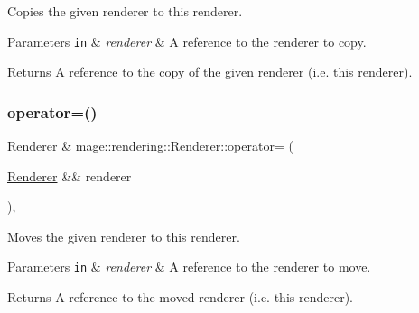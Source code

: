 Copies the given renderer to this renderer.


\begin{DoxyParams}[1]{Parameters}
\mbox{\tt in}  & {\em renderer} & A reference to the renderer to copy. \\
\hline
\end{DoxyParams}
\begin{DoxyReturn}{Returns}
A reference to the copy of the given renderer (i.\+e. this renderer). 
\end{DoxyReturn}
\mbox{\label{classmage_1_1rendering_1_1_renderer_a8f0f0323dc57cf2e1f76491bf6eaa97a}} 
\subsubsection{\texorpdfstring{operator=()}{operator=()}\hspace{0.1cm}{\footnotesize\ttfamily [2/2]}}
{\footnotesize\ttfamily \mbox{\hyperlink{classmage_1_1rendering_1_1_renderer}{Renderer}} \& mage\+::rendering\+::\+Renderer\+::operator= (\begin{DoxyParamCaption}\item[{\mbox{\hyperlink{classmage_1_1rendering_1_1_renderer}{Renderer}} \&\&}]{renderer }\end{DoxyParamCaption})\hspace{0.3cm}{\ttfamily [default]}, {\ttfamily [noexcept]}}

Moves the given renderer to this renderer.


\begin{DoxyParams}[1]{Parameters}
\mbox{\tt in}  & {\em renderer} & A reference to the renderer to move. \\
\hline
\end{DoxyParams}
\begin{DoxyReturn}{Returns}
A reference to the moved renderer (i.\+e. this renderer). 
\end{DoxyReturn}
\mbox{\label{classmage_1_1rendering_1_1_renderer_abbab1dd0a3a4eb06cb6fd4f0a75eb192}} 
